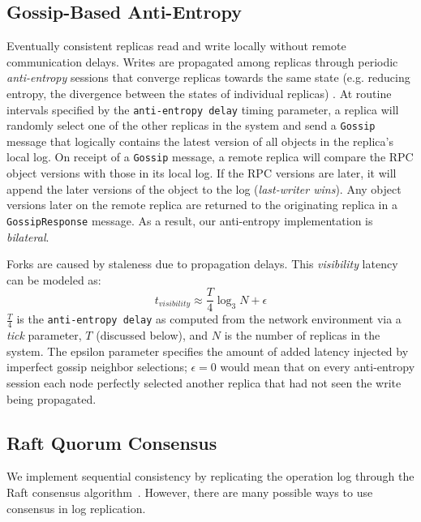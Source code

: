 \documentclass[10pt,conference,letterpaper]{IEEEtran}
\begin{document}
\subsection{Gossip-Based Anti-Entropy}

Eventually consistent replicas  read and write locally without remote communication delays.
Writes are propagated among replicas through
periodic \textit{anti-entropy} sessions that
converge replicas towards the same state (e.g.
reducing entropy, the divergence between the states of individual replicas)
\cite{kempe_gossip-based_2003}.
At routine intervals specified by the \texttt{anti-entropy delay} timing parameter, a
replica will randomly select one of the other replicas in the system and send a
\texttt{Gossip} message that logically contains the latest version of all objects in the replica's
local log.
On receipt of a \texttt{Gossip} message, a remote replica will compare the RPC object
versions with those in its local log.
If the RPC versions are later, it will append the later versions of the object to the log
(\textit{last-writer wins}).
Any object versions later on the remote replica are returned to the
originating replica in a \texttt{GossipResponse} message.
As a result, our anti-entropy implementation is \textit{bilateral}.

Forks are caused by staleness due to propagation delays.
This \emph{visibility} latency can be modeled as:
\begin{equation}
t_{visibility} \approx \frac{T}{4} \log_3N + \epsilon
\end{equation}
$\frac{T}{4}$ is the
\texttt{anti-entropy delay} as computed from the network environment via a \emph{tick}
parameter, $T$ (discussed below), and $N$ is the number of replicas in the system.
The epsilon parameter specifies the amount of added latency injected by imperfect gossip
neighbor selections; $\epsilon = 0$ would mean that on every anti-entropy session
each node perfectly selected another replica that had not seen the write being propagated.

\subsection{Raft Quorum Consensus}

We implement sequential consistency by replicating the operation log through the Raft
consensus algorithm~\cite{ongaro_search_2014}.
However, there are many possible ways to use consensus in log replication. 
\end{document}
